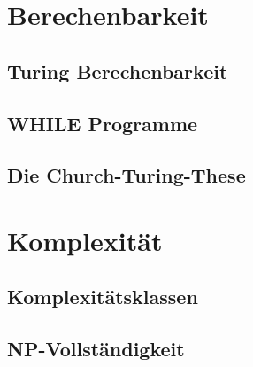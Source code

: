 \documentclass[12pt,a4paper]{article}
\begin{document}
\section{Berechenbarkeit}
	\subsection{Turing Berechenbarkeit}

	\subsection{WHILE Programme}

	\subsection{Die Church-Turing-These}

\section{Komplexität}
	\subsection{Komplexitätsklassen}

	\subsection{NP-Vollständigkeit}
\end{document}
